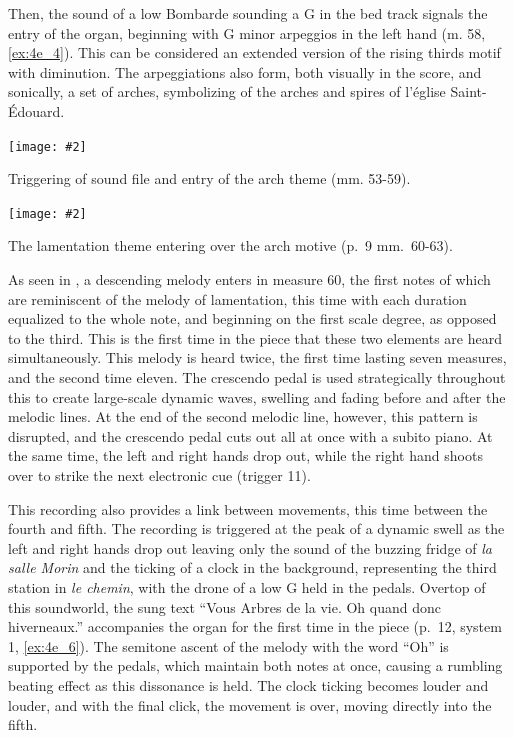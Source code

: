\documentclass[12pt,twoside,maitrise]{dms_ks}
\newcommand{\customincludeexamples}[4][]{%
    \begin{example}[H]
        \centering
        \texttt{[image: \#2]}
        \caption{#4}
	\label{#3} 
    \end{example}
}
\theoremstyle{definition}
\begin{document}
{{Then, the sound of a low Bombarde sounding a G in the bed track signals the entry of the organ, beginning with G minor arpeggios in the left hand (m. 58, \cref{ex:4e_4}). This can be considered an extended version of the rising thirds motif with diminution. 
The arpeggiations also form, both visually in the score, and sonically, a set of arches, symbolizing of the arches and spires of l'église Saint-Édouard.

\customincludeexamples[width=\textwidth]{4e_4}{ex:4e_4}{Triggering of sound file and entry of the arch theme (mm. 53-59).}

\customincludeexamples[width=\textwidth]{4e_5}{ex:4e_5}{The lamentation theme entering over the arch motive (p.~9 mm.~60-63).}

As seen in , a descending melody enters in measure 60, the first notes of which are reminiscent of the melody of lamentation, this time with each duration equalized to the whole note, and beginning on the first scale degree, as opposed to the third. 
This is the first time in the piece that these two elements are heard simultaneously. 
This melody is heard twice, the first time lasting seven measures, and the second time eleven. 
The crescendo pedal is used strategically throughout this to create large-scale dynamic waves, swelling and fading before and after the melodic lines. 
At the end of the second melodic line, however, this pattern is disrupted, and the crescendo pedal cuts out all at once with a subito piano. 
At the same time, the left and right hands drop out, while the right hand shoots over to strike the next electronic cue (trigger 11). 

This recording also provides a link between movements, this time between the fourth and fifth. 
The recording is triggered at the peak of a dynamic swell as the left and right hands drop out leaving only the sound of the buzzing fridge of \textit{la salle Morin} and the ticking of a clock in the background, representing the third station in \textit{le chemin}, with the drone of a low G held in the pedals. 
Overtop of this soundworld, the sung text “Vous Arbres de la vie. Oh quand donc hiverneaux.” accompanies the organ for the first time in the piece (p.~12, system 1, \cref{ex:4e_6}). 
The semitone ascent of the melody with the word “Oh” is supported by the pedals, which maintain both notes at once, causing a rumbling beating effect as this dissonance is held. 
The clock ticking becomes louder and louder, and with the final click, the movement is over, moving directly into the fifth.

}}
\end{document}

